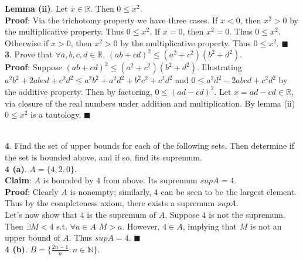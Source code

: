 \documentclass[ 12pt ]{article}
\begin{document}
\noindent \textbf{Lemma (ii)}. Let $x \in \mathbb{R}$. Then $0 \leq x^2$. \\

\noindent \textbf{Proof}: Via the trichotomy property we have three cases.
	If $x < 0$, then $x^2 > 0$ by the multiplicative property. Thus $0 \leq x^2$.
	If $x = 0$, then $x^2 = 0$. Thus $0 \leq x^2$.
	Otherwise if $x > 0$, then $x^2 > 0$ by the multiplicative property. Thus
	$0 \leq x^2$. $\blacksquare$ \\

\noindent \textbf{3}. Prove that $\forall a,b,c,d \in \mathbb{R}$,
	$(ab + cd)^2 \leq (a^2 + c^2)(b^2 + d^2)$. \\

\noindent \textbf{Proof}: Suppose $(ab + cd)^2 \leq (a^2 + c^2)(b^2 + d^2)$.
	Illustrating
	$a^2 b^2 + 2abcd + c^2 d^2 \leq a^2 b^2 + a^2 d^2 + b^2 c^2 + c^2 d^2$ and
	$0 \leq a^2 d^2 - 2abcd + c^2 d^2$ by the additive property.
	Then by factoring, $0 \leq (ad - cd)^2$. Let $x = ad - cd \in \mathbb{R}$,
	via closure of the real numbers under addition and multiplication. By lemma
	(ii) $0 \leq x^2$ is a tautology. $\blacksquare$ \\ \\
\newpage


\noindent \textbf{4}. Find the set of upper bounds for each of the following
	sets. Then determine if the set is bounded above, and if so, find its
	supremum. \\

\noindent \textbf{4 (a)}. $A = \{ 4, 2, 0 \}$. \\

\noindent \textbf{Claim}: $A$ is bounded by $4$ from above. Its supremum
	$supA = 4$. \\

\noindent \textbf{Proof}: Clearly $A$ is nonempty; similarly, $4$ can be seen to
	be the largest element. Thus by the completeness axiom, there exists a
	supremum $supA$. \\

\noindent Let's now show that $4$ is the supremum of $A$. Suppose $4$ is not the
	supremum. Then $\exists M < 4$ s.t. $\forall a \in A$ $M > a$. However,
	$4 \in A$, implying that $M$ is not an upper bound of $A$. Thus $supA = 4$.
	$\blacksquare$ \\

\noindent \textbf{4 (b)}. $B = \{ \frac{2n - 1}{n}: n \in \mathbb{N} \}$. \\
\end{document}
